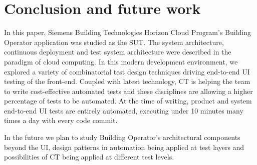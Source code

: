 \documentclass[conference]{IEEEtran}
\begin{document}
\section{Conclusion and future work}
In this paper, Siemens Building Technologies Horizon Cloud Program’s Building Operator application was studied as the SUT.
The system architecture, continuous deployment and test system architecture were described in the paradigm of cloud computing.
In this modern development environment, we explored a variety of combinatorial test design techniques driving end-to-end UI testing of the front-end.
Coupled with latest technology, CT is helping the team to write cost-effective automated tests and these disciplines are allowing a higher percentage of tests to be automated.
At the time of writing, product and system end-to-end UI tests are entirely automated, executing under 10 minutes many times a day with every code commit.

In the future we plan to study Building Operator's architectural components beyond the UI, design patterns in automation being applied at test layers and possibilities of CT being applied at different test levels. 



\end{document}
